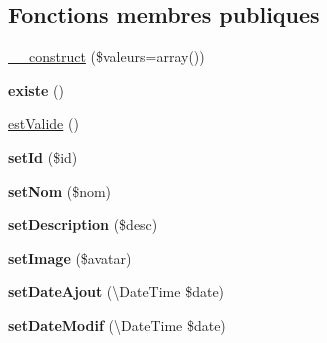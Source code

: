 \subsection*{Fonctions membres publiques}
\begin{DoxyCompactItemize}
\item 
\hyperlink{class_library_1_1_entities_1_1_partenaire_a6a8dd1d972925f6a5e98fadc554f6710}{\+\_\+\+\_\+construct} (\$valeurs=array())
\item 
\hypertarget{class_library_1_1_entities_1_1_partenaire_ab8d4d5d88bf20eccb470f6c675299675}{{\bfseries existe} ()}\label{class_library_1_1_entities_1_1_partenaire_ab8d4d5d88bf20eccb470f6c675299675}

\item 
\hyperlink{class_library_1_1_entities_1_1_partenaire_ad2696392106fc5da9c1ab0e5f8985531}{est\+Valide} ()
\item 
\hypertarget{class_library_1_1_entities_1_1_partenaire_a87313ad678fb2a2a8efb435cf0bdb9a0}{{\bfseries set\+Id} (\$id)}\label{class_library_1_1_entities_1_1_partenaire_a87313ad678fb2a2a8efb435cf0bdb9a0}

\item 
\hypertarget{class_library_1_1_entities_1_1_partenaire_a3c162f28ffbb9c8026c0d84f722e5060}{{\bfseries set\+Nom} (\$nom)}\label{class_library_1_1_entities_1_1_partenaire_a3c162f28ffbb9c8026c0d84f722e5060}

\item 
\hypertarget{class_library_1_1_entities_1_1_partenaire_a88655faf7c28f0586fb08bc11054e30b}{{\bfseries set\+Description} (\$desc)}\label{class_library_1_1_entities_1_1_partenaire_a88655faf7c28f0586fb08bc11054e30b}

\item 
\hypertarget{class_library_1_1_entities_1_1_partenaire_a9188331514be772143d5ad165bf257f6}{{\bfseries set\+Image} (\$avatar)}\label{class_library_1_1_entities_1_1_partenaire_a9188331514be772143d5ad165bf257f6}

\item 
\hypertarget{class_library_1_1_entities_1_1_partenaire_a2aaadb9f9a1ede972852caa15be46469}{{\bfseries set\+Date\+Ajout} (\textbackslash{}Date\+Time \$date)}\label{class_library_1_1_entities_1_1_partenaire_a2aaadb9f9a1ede972852caa15be46469}

\item 
\hypertarget{class_library_1_1_entities_1_1_partenaire_a8f0e484c9b8f472351418ed202bb8800}{{\bfseries set\+Date\+Modif} (\textbackslash{}Date\+Time \$date)}\label{class_library_1_1_entities_1_1_partenaire_a8f0e484c9b8f472351418ed202bb8800}


\end{DoxyCompactItemize}
